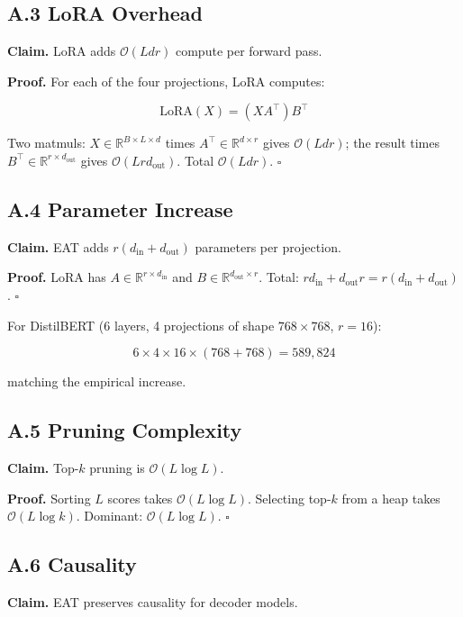 \subsection{A.3 LoRA Overhead}

\textbf{Claim.} LoRA adds $\mathcal{O}(L d r)$ compute per forward pass.

\textbf{Proof.} For each of the four projections, LoRA computes:

\[
\text{LoRA}(X) = (X A^\top) B^\top
\]

Two matmuls: $X \in \mathbb{R}^{B \times L \times d}$ times $A^\top \in \mathbb{R}^{d \times r}$ 
gives $\mathcal{O}(L d r)$; the result times $B^\top \in \mathbb{R}^{r \times d_\text{out}}$ 
gives $\mathcal{O}(L r d_\text{out})$. Total $\mathcal{O}(L d r)$. $\square$

\subsection{A.4 Parameter Increase}

\textbf{Claim.} EAT adds $r(d_\text{in} + d_\text{out})$ parameters per projection.

\textbf{Proof.} LoRA has $A \in \mathbb{R}^{r \times d_\text{in}}$ and 
$B \in \mathbb{R}^{d_\text{out} \times r}$. Total: $r d_\text{in} + d_\text{out} r = r(d_\text{in} + d_\text{out})$. $\square$

For DistilBERT (6 layers, 4 projections of shape $768 \times 768$, $r = 16$):

\[
6 \times 4 \times 16 \times (768 + 768) = 589{,}824
\]

matching the empirical increase.

\subsection{A.5 Pruning Complexity}

\textbf{Claim.} Top-$k$ pruning is $\mathcal{O}(L \log L)$.

\textbf{Proof.} Sorting $L$ scores takes $\mathcal{O}(L \log L)$. Selecting top-$k$ 
from a heap takes $\mathcal{O}(L \log k)$. Dominant: $\mathcal{O}(L \log L)$. $\square$

\subsection{A.6 Causality}

\textbf{Claim.} EAT preserves causality for decoder models.

